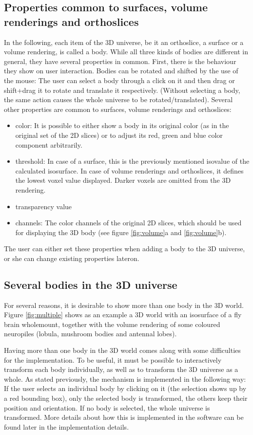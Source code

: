 \documentclass[a4paper,10pt]{article}
\begin{document}
\subsection{Properties common to surfaces, volume renderings and orthoslices}
In the following, each item of the 3D universe, be it an orthoslice, a surface or a volume rendering, is called a body.
While all three kinds of bodies are different in general, they have several properties in common.
First, there is the behaviour they show on user interaction. Bodies can be rotated and shifted by the use of the mouse: The user can select a body through a click on it and then drag or shift+drag it to rotate and translate it respectively. (Without selecting a body, the same action causes the whole universe to be rotated/translated).
Several other properties are common to surfaces, volume renderings and orthoslices:
\begin{itemize}
\item color: It is possible to either show a body in its original color (as in the original set of the 2D slices) or to adjust its red, green and blue color component arbitrarily.
\item threshold: In case of a surface, this is the previously mentioned isovalue of the calculated isosurface. In case of volume renderings and orthoslices, it defines the lowest voxel value displayed. Darker voxels are omitted from the 3D rendering.
\item transparency value
\item channels: The color channels of the original 2D slices, which should be used for displaying the 3D body (see figure \ref{fig:volume}a and \ref{fig:volume}b).
\end{itemize}

The user can either set these properties when adding a body to the 3D universe, or she can change existing properties lateron.

\subsection{Several bodies in the 3D universe}
For several reasons, it is desirable to show more than one body in the 3D world.
Figure \ref{fig:multiple} shows as an example a 3D world with an isosurface of a fly brain wholemount, together with the volume rendering of some coloured neuropiles (lobula, mushroom bodies and antennal lobes).

Having more than one body in the 3D world comes along with some difficulties for the implementation. To be useful, it must be possible to interactively transform each body individually, as well as to transform the 3D universe as a whole. As stated previously, the mechanism is implemented in the following way: If the user selects an individual body by clicking on it (the selection shows up by a red bounding box), only the selected body is transformed, the others keep their position and orientation. If no body is selected, the whole universe is transformed.
More details about how this is implemented in the software can be found later in the implementation details.
\end{document}
